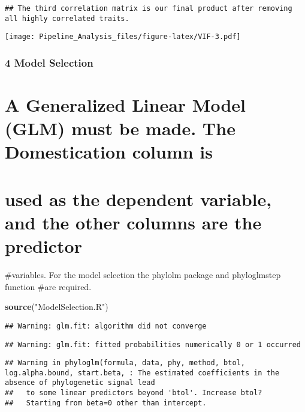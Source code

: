 \documentclass[
]{article}
\newenvironment{Shaded}{\begin{snugshade}}{\end{snugshade}}
\newcommand{\KeywordTok}[1]{\textcolor[rgb]{0.13,0.29,0.53}{\textbf{#1}}}
\newcommand{\NormalTok}[1]{#1}
\newcommand{\StringTok}[1]{\textcolor[rgb]{0.31,0.60,0.02}{#1}}
\begin{document}
\begin{verbatim}
## The third correlation matrix is our final product after removing all highly correlated traits.
\end{verbatim}

\texttt{[image: Pipeline\_Analysis\_files/figure-latex/VIF-3.pdf]}

\hypertarget{model-selection}{%
\subsubsection{4 Model Selection}\label{model-selection}}

\hypertarget{a-generalized-linear-model-glm-must-be-made.-the-domestication-column-is}{%
\section{A Generalized Linear Model (GLM) must be made. The
Domestication column
is}\label{a-generalized-linear-model-glm-must-be-made.-the-domestication-column-is}}

\hypertarget{used-as-the-dependent-variable-and-the-other-columns-are-the-predictor}{%
\section{used as the dependent variable, and the other columns are the
predictor}\label{used-as-the-dependent-variable-and-the-other-columns-are-the-predictor}}

\#variables. For the model selection the phylolm package and
phyloglmstep function \#are required.

\begin{Shaded}
\begin{Highlighting}[]
\KeywordTok{source}\NormalTok{(}\StringTok{"ModelSelection.R"}\NormalTok{)}
\end{Highlighting}
\end{Shaded}

\begin{verbatim}
## Warning: glm.fit: algorithm did not converge
\end{verbatim}

\begin{verbatim}
## Warning: glm.fit: fitted probabilities numerically 0 or 1 occurred
\end{verbatim}

\begin{verbatim}
## Warning in phyloglm(formula, data, phy, method, btol, log.alpha.bound, start.beta, : The estimated coefficients in the absence of phylogenetic signal lead
##   to some linear predictors beyond 'btol'. Increase btol?
##   Starting from beta=0 other than intercept.
\end{verbatim}
\end{document}

